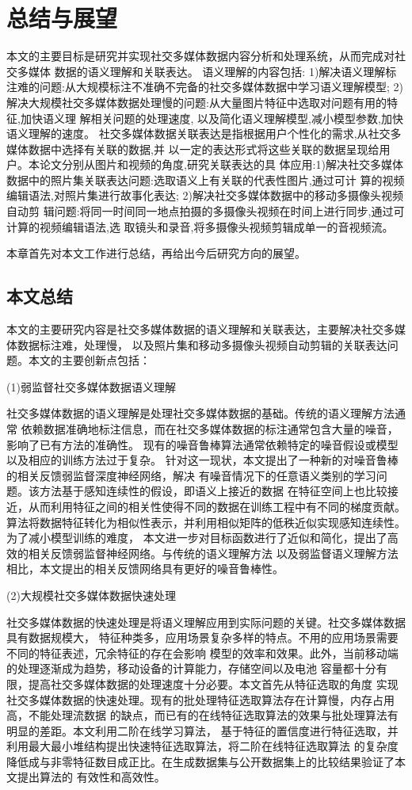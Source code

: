 \chapter{总结与展望}
本文的主要目标是研究并实现社交多媒体数据内容分析和处理系统，从而完成对社交多媒体
数据的语义理解和关联表达。
语义理解的内容包括:
1)解决语义理解标注难的问题:从大规模标注不准确不完备的社交多媒体数据中学习语义理解模型;
2)解决大规模社交多媒体数据处理慢的问题:从大量图片特征中选取对问题有用的特征,加快语义理
解相关问题的处理速度, 以及简化语义理解模型,减小模型参数,加快语义理解的速度。
社交多媒体数据关联表达是指根据用户个性化的需求,从社交多媒体数据中选择有关联的数据,并
以一定的表达形式将这些关联的数据呈现给用户。本论文分别从图片和视频的角度,研究关联表达的具
体应用:1)解决社交多媒体数据中的照片集关联表达问题:选取语义上有关联的代表性图片,通过可计
算的视频编辑语法,对照片集进行故事化表达; 2)解决社交多媒体数据中的移动多摄像头视频自动剪
辑问题:将同一时间同一地点拍摄的多摄像头视频在时间上进行同步,通过可计算的视频编辑语法,选
取镜头和录音,将多摄像头视频剪辑成单一的音视频流。

本章首先对本文工作进行总结，再给出今后研究方向的展望。

\section{本文总结}
本文的主要研究内容是社交多媒体数据的语义理解和关联表达，主要解决社交多媒体数据标注难，处理慢，
以及照片集和移动多摄像头视频自动剪辑的关联表达问题。本文的主要创新点包括：

(1)弱监督社交多媒体数据语义理解

社交多媒体数据的语义理解是处理社交多媒体数据的基础。传统的语义理解方法通常
依赖数据准确地标注信息，而在社交多媒体数据的标注通常包含大量的噪音，影响了已有方法的准确性。
现有的噪音鲁棒算法通常依赖特定的噪音假设或模型以及相应的训练方法过于复杂。
针对这一现状，本文提出了一种新的对噪音鲁棒的相关反馈弱监督深度神经网络，解决
有噪音情况下的任意语义类别的学习问题。该方法基于感知连续性的假设，即语义上接近的数据
在特征空间上也比较接近，从而利用特征之间的相关性使得不同的数据在训练工程中有不同的梯度贡献。
算法将数据特征转化为相似性表示，并利用相似矩阵的低秩近似实现感知连续性。为了减小模型训练的难度，
本文进一步对目标函数进行了近似和简化，提出了高效的相关反馈弱监督神经网络。与传统的语义理解方法
以及弱监督语义理解方法相比，本文提出的相关反馈网络具有更好的噪音鲁棒性。

(2)大规模社交多媒体数据快速处理

社交多媒体数据的快速处理是将语义理解应用到实际问题的关键。社交多媒体数据具有数据规模大，
特征种类多，应用场景复杂多样的特点。不用的应用场景需要不同的特征表述，冗余特征的存在会影响
模型的效率和效果。此外，当前移动端的处理逐渐成为趋势，移动设备的计算能力，存储空间以及电池
容量都十分有限，提高社交多媒体数据的处理速度十分必要。本文首先从特征选取的角度
实现社交多媒体数据的快速处理。现有的批处理特征选取算法存在计算慢，内存占用高，不能处理流数据
的缺点，而已有的在线特征选取算法的效果与批处理算法有明显的差距。本文利用二阶在线学习算法，
基于特征的置信度进行特征选取，并利用最大最小堆结构提出快速特征选取算法，将二阶在线特征选取算法
的复杂度降低成与非零特征数目成正比。在生成数据集与公开数据集上的比较结果验证了本文提出算法的
有效性和高效性。

